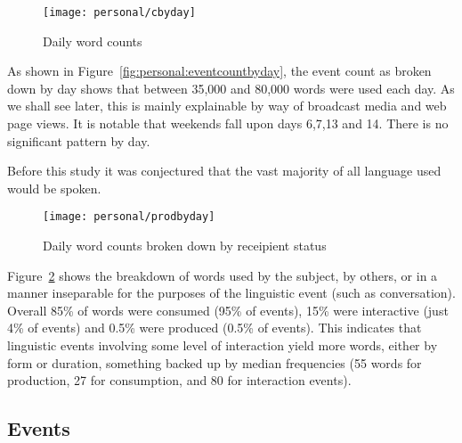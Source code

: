 % 


\begin{figure}[htb]
    \centering
    \texttt{[image: personal/cbyday]}
    \caption{Daily word counts}
    \label{fig:personal:wordcountbyday}
\end{figure}

As shown in Figure~\ref{fig:personal:eventcountbyday}, the event count as broken down by day shows that between 35,000 and 80,000 words were used each day.  As we shall see later, this is mainly explainable by way of broadcast media and web page views.  It is notable that weekends fall upon days 6,7,13 and 14.  There is no significant pattern by day.

Before this study it was conjectured that the vast majority of all language used would be spoken.


\begin{figure}[htb]
    \centering
    \texttt{[image: personal/prodbyday]}
    \caption{Daily word counts broken down by receipient status}
    \label{fig:personal:prodcountbyday}
\end{figure}

Figure~\ref{fig:personal:prodcountbyday} shows the breakdown of words used by the subject, by others, or in a manner inseparable for the purposes of the linguistic event (such as conversation).  Overall 85\% of words were consumed (95\% of events), 15\% were interactive (just 4\% of events) and 0.5\% were produced (0.5\% of events).  This indicates that linguistic events involving some level of interaction yield more words, either by form or duration, something backed up by median frequencies (55 words for production, 27 for consumption, and 80 for interaction events).










\subsection{Events}



